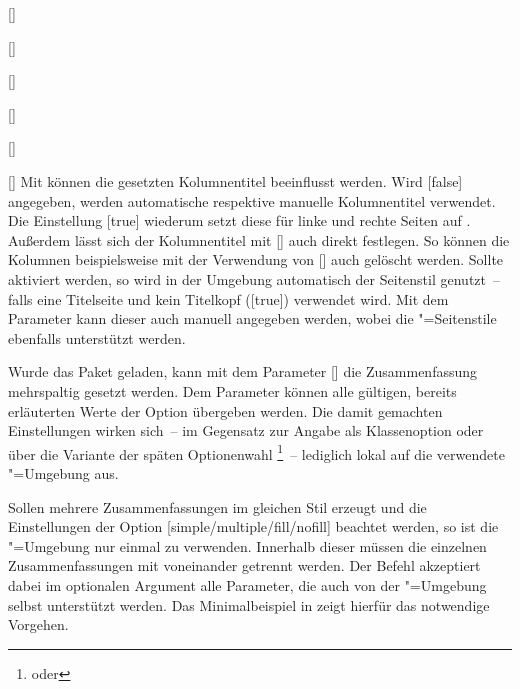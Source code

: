 \begin{Declaration}{[]}
\begin{Declaration}[v2.02]{}
\begin{Declaration}{[]}
\begin{Declaration}[v2.02]{%
  []%
}
\begin{Declaration}[v2.02]{%
  []%
}
\begin{Declaration}{[]}
\begin{Declaration}{[\PSet]}{%
}
Mit  können die gesetzten Kolumnentitel 
beeinflusst werden. Wird [false] 
angegeben, werden automatische respektive manuelle Kolumnentitel verwendet. Die 
Einstellung [true] wiederum setzt diese 
für linke und rechte Seiten auf . Außerdem lässt sich der 
Kolumnentitel mit [] 
auch direkt festlegen. So können die Kolumnen beispielsweise mit der Verwendung 
von [\PParameter{}] auch gelöscht werden. 
Sollte  aktiviert werden, so wird in der
Umgebung automatisch der Seitenstil  genutzt~-- falls eine 
Titelseite und kein Titelkopf ([true]) verwendet wird. Mit 
dem Parameter  kann dieser auch manuell 
angegeben werden, wobei die "=Seitenstile ebenfalls 
unterstützt werden.

Wurde das Paket  geladen, kann mit dem Parameter 
[] die Zusammenfassung 
mehrspaltig gesetzt werden. Dem Parameter  
können alle gültigen, bereits erläuterten Werte der Option  
übergeben werden. Die damit gemachten Einstellungen wirken sich~-- im Gegensatz 
zur Angabe als Klassenoption oder über die Variante der späten Optionenwahl%
\footnote{%
   oder
}~-- lediglich lokal auf die verwendete "=Umgebung aus.

Sollen mehrere Zusammenfassungen im gleichen Stil erzeugt und die Einstellungen 
der Option [simple/multiple/fill/nofill] beachtet werden, so 
ist die "=Umgebung nur einmal zu verwenden. Innerhalb 
dieser müssen die einzelnen Zusammenfassungen mit  
voneinander getrennt werden. Der Befehl akzeptiert dabei im optionalen Argument 
alle Parameter, die auch von der "=Umgebung selbst 
unterstützt werden. Das Minimalbeispiel in  
zeigt hierfür das notwendige Vorgehen.


\end{Declaration}
\end{Declaration}
\end{Declaration}
\end{Declaration}
\end{Declaration}
\end{Declaration}
\end{Declaration}
